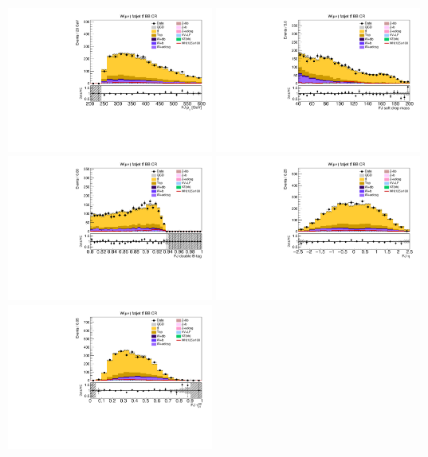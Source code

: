 \begin{figure}[tbp]
  \begin{center}
    \includegraphics[width=0.48\textwidth]{figures/wlnhbb2016/boosted/WmnWHTT2bFJCR_fj1Pt.pdf}
    \includegraphics[width=0.48\textwidth]{figures/wlnhbb2016/boosted/WmnWHTT2bFJCR_fj1MSD_corr.pdf}
    \includegraphics[width=0.48\textwidth]{figures/wlnhbb2016/boosted/WmnWHTT2bFJCR_fj1DoubleCSV.pdf}
    \includegraphics[width=0.48\textwidth]{figures/wlnhbb2016/boosted/WmnWHTT2bFJCR_fj1Eta.pdf}
    \includegraphics[width=0.48\textwidth]{figures/wlnhbb2016/boosted/WmnWHTT2bFJCR_fj1Tau21SD.pdf}

\end{center}
\end{figure}

